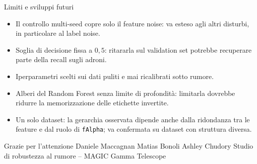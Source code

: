 \documentclass[aspectratio=169,11pt]{beamer}
\newcommand{\feat}[1]{\texttt{#1}}
\begin{document}
\begin{frame}{Limiti e sviluppi futuri}
  \begin{itemize}
    \item Il controllo multi-seed copre solo il feature noise: va esteso agli
          altri disturbi, in particolare al label noise.
    \item Soglia di decisione fissa a $0{,}5$: ritararla sul validation set
          potrebbe recuperare parte della recall sugli adroni.
    \item Iperparametri scelti sui dati puliti e mai ricalibrati sotto rumore.
    \item Alberi del Random Forest senza limite di profondità: limitarla
          dovrebbe ridurre la memorizzazione delle etichette invertite.
    \item Un solo dataset: la gerarchia osservata dipende anche dalla ridondanza
          tra le feature e dal ruolo di \feat{fAlpha}; va confermata su dataset
          con struttura diversa.
  \end{itemize}
\end{frame}

\begin{frame}[plain]
  \centering
  \vfill
  {\Large Grazie per l'attenzione}
  \vfill
  {\small Daniele Maccagnan \quad Matias Bonoli \quad Ashley Chudory}
  \vfill
  {\footnotesize Studio di robustezza al rumore -- MAGIC Gamma Telescope}
  \vfill
\end{frame}
\end{document}
